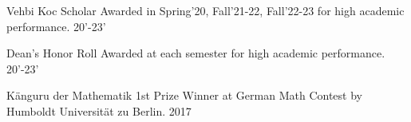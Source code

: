 
\begin{cvhonors}
  \cvhonor
    {Vehbi Koc Scholar}
    {Awarded in Spring'20, Fall'21-22, Fall'22-23 for high academic performance.}
    {}
    {20’-23’}

  \cvhonor
    {Dean's Honor Roll}
    {Awarded at each semester for high academic performance.}
    {}
    {20’-23’}

  \cvhonor
    {Känguru der Mathematik}
    {1st Prize Winner at German Math Contest by Humboldt Universität zu Berlin.}
    {}
    {2017}

\end{cvhonors}

